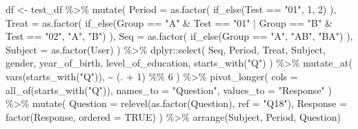 \documentclass[
  12pt,
  a4paper,
  extrafontsizes,
  onecolumn,
  openright]{memoir}
\newenvironment{Shaded}{\begin{snugshade}}{\end{snugshade}}
\newcommand{\AttributeTok}[1]{\textcolor[rgb]{0.40,0.45,0.13}{#1}}
\newcommand{\ConstantTok}[1]{\textcolor[rgb]{0.56,0.35,0.01}{#1}}
\newcommand{\DecValTok}[1]{\textcolor[rgb]{0.68,0.00,0.00}{#1}}
\newcommand{\FunctionTok}[1]{\textcolor[rgb]{0.28,0.35,0.67}{#1}}
\newcommand{\NormalTok}[1]{\textcolor[rgb]{0.00,0.23,0.31}{#1}}
\newcommand{\OtherTok}[1]{\textcolor[rgb]{0.00,0.23,0.31}{#1}}
\newcommand{\SpecialCharTok}[1]{\textcolor[rgb]{0.37,0.37,0.37}{#1}}
\newcommand{\StringTok}[1]{\textcolor[rgb]{0.13,0.47,0.30}{#1}}
\begin{document}
\begin{Shaded}
\begin{Highlighting}[]
\NormalTok{df }\OtherTok{\textless{}{-}}\NormalTok{ test\_df }\SpecialCharTok{\%\textgreater{}\%}
    \FunctionTok{mutate}\NormalTok{(}
        \AttributeTok{Period =} \FunctionTok{as.factor}\NormalTok{(}
            \FunctionTok{if\_else}\NormalTok{(Test }\SpecialCharTok{==} \StringTok{"01"}\NormalTok{, }\DecValTok{1}\NormalTok{, }\DecValTok{2}\NormalTok{)}
\NormalTok{        ),}
        \AttributeTok{Treat =} \FunctionTok{as.factor}\NormalTok{(}
            \FunctionTok{if\_else}\NormalTok{(Group }\SpecialCharTok{==} \StringTok{"A"} \SpecialCharTok{\&}\NormalTok{ Test }\SpecialCharTok{==} \StringTok{"01"} \SpecialCharTok{|}\NormalTok{ Group }\SpecialCharTok{==} \StringTok{"B"} \SpecialCharTok{\&}\NormalTok{ Test }\SpecialCharTok{==} \StringTok{"02"}\NormalTok{, }\StringTok{"A"}\NormalTok{, }\StringTok{"B"}\NormalTok{)}
\NormalTok{        ),}
        \AttributeTok{Seq =} \FunctionTok{as.factor}\NormalTok{(}
            \FunctionTok{if\_else}\NormalTok{(Group }\SpecialCharTok{==} \StringTok{"A"}\NormalTok{, }\StringTok{"AB"}\NormalTok{, }\StringTok{"BA"}\NormalTok{)}
\NormalTok{        ),}
        \AttributeTok{Subject =} \FunctionTok{as.factor}\NormalTok{(User)}
\NormalTok{    ) }\SpecialCharTok{\%\textgreater{}\%}
\NormalTok{    dplyr}\SpecialCharTok{::}\FunctionTok{select}\NormalTok{(}
\NormalTok{        Seq, Period, Treat, Subject,}
\NormalTok{        gender, year\_of\_birth, level\_of\_education, }\FunctionTok{starts\_with}\NormalTok{(}\StringTok{"Q"}\NormalTok{)}
\NormalTok{    ) }\SpecialCharTok{\%\textgreater{}\%}
    \FunctionTok{mutate\_at}\NormalTok{(}
        \FunctionTok{vars}\NormalTok{(}\FunctionTok{starts\_with}\NormalTok{(}\StringTok{"Q"}\NormalTok{)), }\SpecialCharTok{\textasciitilde{}}\NormalTok{ (. }\SpecialCharTok{+} \DecValTok{1}\NormalTok{) }\SpecialCharTok{\%\%} \DecValTok{6}
\NormalTok{    ) }\SpecialCharTok{\%\textgreater{}\%}
    \FunctionTok{pivot\_longer}\NormalTok{(}
        \AttributeTok{cols =} \FunctionTok{all\_of}\NormalTok{(}\FunctionTok{starts\_with}\NormalTok{(}\StringTok{"Q"}\NormalTok{)),}
        \AttributeTok{names\_to =} \StringTok{"Question"}\NormalTok{,}
        \AttributeTok{values\_to =} \StringTok{"Response"}
\NormalTok{    ) }\SpecialCharTok{\%\textgreater{}\%}
    \FunctionTok{mutate}\NormalTok{(}
        \AttributeTok{Question =} \FunctionTok{relevel}\NormalTok{(}\FunctionTok{as.factor}\NormalTok{(Question), }\AttributeTok{ref =} \StringTok{"Q18"}\NormalTok{),}
        \AttributeTok{Response =} \FunctionTok{factor}\NormalTok{(Response, }\AttributeTok{ordered =} \ConstantTok{TRUE}\NormalTok{)}
\NormalTok{    ) }\SpecialCharTok{\%\textgreater{}\%}
    \FunctionTok{arrange}\NormalTok{(Subject, Period, Question)}


\end{Highlighting}
\end{Shaded}
\end{document}
